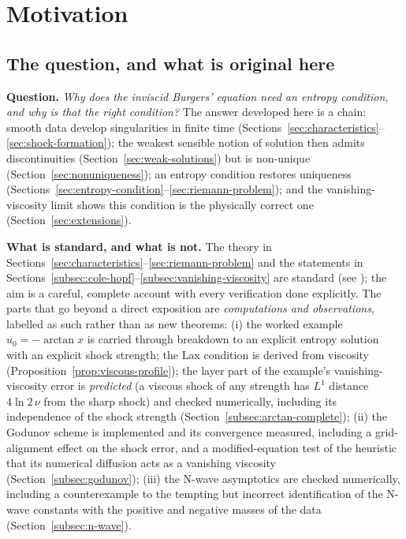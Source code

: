 
\section{Motivation}
\label{sec:motivation}

\subsection{The question, and what is original here}
\label{subsec:question}

\noindent\textbf{Question.} \emph{Why does the inviscid Burgers' equation
need an entropy condition, and why is that the right condition?} The
answer developed here is a chain: smooth data develop singularities in
finite time (Sections~\ref{sec:characteristics}--\ref{sec:shock-formation});
the weakest sensible notion of solution then admits discontinuities
(Section~\ref{sec:weak-solutions}) but is non-unique
(Section~\ref{sec:nonuniqueness}); an entropy condition restores uniqueness
(Sections~\ref{sec:entropy-condition}--\ref{sec:riemann-problem}); and the
vanishing-viscosity limit shows this condition is the physically correct one
(Section~\ref{sec:extensions}).

\noindent\textbf{What is standard, and what is not.} The theory in
Sections~\ref{sec:characteristics}--\ref{sec:riemann-problem} and the
statements in Sections~\ref{subsec:cole-hopf}--\ref{subsec:vanishing-viscosity}
are standard (see \cite[\S3.4]{evans2010}); the aim is a careful, complete
account with every verification done explicitly. The parts that go beyond
a direct exposition are \emph{computations and observations}, labelled as
such rather than as new theorems: (i) the worked
example $u_0=-\arctan x$ is carried through breakdown to an explicit entropy
solution with an explicit shock strength; the Lax condition is derived from viscosity
(Proposition~\ref{prop:viscous-profile}); the layer part of the example's
vanishing-viscosity error is \emph{predicted} (a viscous shock of any strength
has $L^1$ distance $4\ln2\,\nu$ from the sharp shock) and checked numerically,
including its independence of the shock strength (Section~\ref{subsec:arctan-complete}); (ii) the Godunov scheme
is implemented and its convergence measured, including a grid-alignment
effect on the shock error, and a modified-equation test of the heuristic
that its numerical diffusion acts as a vanishing viscosity
(Section~\ref{subsec:godunov}); (iii) the N-wave asymptotics are checked
numerically, including a counterexample to the tempting but incorrect
identification of the N-wave constants with the positive and negative
masses of the data (Section~\ref{subsec:n-wave}).


